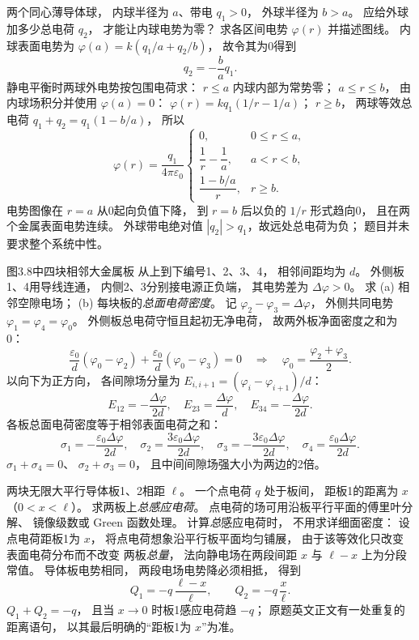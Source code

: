 两个同心薄导体球，
内球半径为 $a$、带电 $q_1>0$，
外球半径为 $b>a$。
应给外球加多少总电荷 $q_2$，
才能让内球电势为零？
求各区间电势 $\varphi(r)$ 并描述图线。
\exsolution
内球表面电势为
$\varphi(a)=k(q_1/a+q_2/b)$，
故令其为0得到
\[
\boxed{q_2=-\frac ba q_1}.
\]
静电平衡时两球外电势按包围电荷求：
$r\le a$ 内球内部为常势零；
$a\le r\le b$，
由内球场积分并使用 $\varphi(a)=0$：
$\varphi(r)=kq_1(1/r-1/a)$；
$r\ge b$，
两球等效总电荷
$q_1+q_2=q_1(1-b/a)$，
所以
\[
\boxed{\varphi(r)=\frac{q_1}{4\pi\varepsilon_0}
\begin{cases}
0,&0\le r\le a,\\
\dfrac1r-\dfrac1a,&a<r<b,\\
\dfrac{1-b/a}{r},&r\ge b.
\end{cases}}
\]
电势图像在 $r=a$ 从0起向负值下降，
到 $r=b$ 后以负的 $1/r$ 形式趋向0，
且在两个金属表面电势连续。
\excheck 外球带电绝对值
$|q_2|>q_1$，故远处总电荷为负；
题目并未要求整个系统中性。

图3.8中四块相邻大金属板
从上到下编号1、2、3、4，
相邻间距均为 $d$。
外侧板1、4用导线连通，
内侧2、3分别接电源正负端，
其电势差为 $\Delta\varphi>0$。
求 (a) 相邻空隙电场；
(b) 每块板的\emph{总面电荷密度}。
\exsolution
记 $\varphi_2-\varphi_3=\Delta\varphi$，
外侧共同电势
$\varphi_1=\varphi_4=\varphi_0$。
外侧板总电荷守恒且起初无净电荷，
故两外板净面密度之和为0：
\[
\frac{\varepsilon_0}{d}(\varphi_0-\varphi_2)
+\frac{\varepsilon_0}{d}(\varphi_0-\varphi_3)=0
\quad\Longrightarrow\quad
\varphi_0=\frac{\varphi_2+\varphi_3}{2}.
\]
以向下为正方向，
各间隙场分量为
$E_{i,i+1}=(\varphi_i-\varphi_{i+1})/d$：
\[
\boxed{E_{12}=-\frac{\Delta\varphi}{2d},\quad
E_{23}=\frac{\Delta\varphi}{d},\quad
E_{34}=-\frac{\Delta\varphi}{2d}}.
\]
各板总面电荷密度等于相邻表面电荷之和：
\[
\boxed{\sigma_1=-\frac{\varepsilon_0\Delta\varphi}{2d},
\quad \sigma_2=\frac{3\varepsilon_0\Delta\varphi}{2d},
\quad \sigma_3=-\frac{3\varepsilon_0\Delta\varphi}{2d},
\quad \sigma_4=\frac{\varepsilon_0\Delta\varphi}{2d}}.
\]
\excheck $\sigma_1+\sigma_4=0$、
$\sigma_2+\sigma_3=0$，
且中间间隙场强大小为两边的2倍。

两块无限大平行导体板1、2相距 $\ell$。
一个点电荷 $q$ 处于板间，
距板1的距离为 $x$（$0<x<\ell$）。
求两板上\emph{总感应电荷}。
\exsolution
点电荷的场可用沿板平行平面的傅里叶分解、
镜像级数或 Green 函数处理。
计算\emph{总}感应电荷时，
不用求详细面密度：
设点电荷距板1为 $x$，
将点电荷想象沿平行板平面均匀铺展，
由于该等效化只改变表面电荷分布而不改变
两板\emph{总量}，
法向静电场在两段间距
$x$ 与 $\ell-x$ 上为分段常值。
导体板电势相同，
两段电场电势降必须相抵，
得到
\[
\boxed{Q_1=-q\,\frac{\ell-x}{\ell}},
\qquad
\boxed{Q_2=-q\,\frac{x}{\ell}}.
\]
\excheck $Q_1+Q_2=-q$，
且当 $x\to0$ 时板1感应电荷趋 $-q$；
原题英文正文有一处重复的距离语句，
以其最后明确的“距板1为 $x$”为准。


